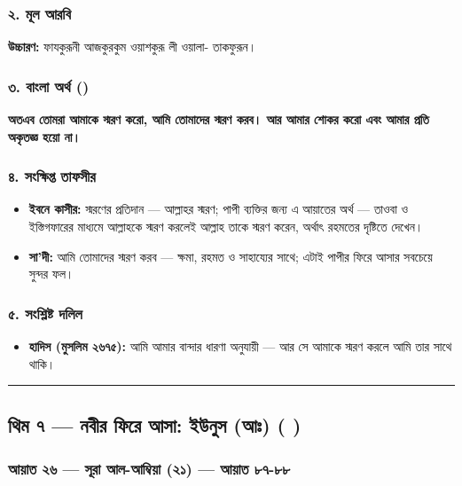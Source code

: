 \subsubsection*{২. মূল আরবি}

\begin{center}\end{center}
\textbf{উচ্চারণ:} ফাযকুরূনী আজকুরকুম ওয়াশকুরূ লী ওয়ালা- তাকফুরূন।

\subsubsection*{৩. বাংলা অর্থ ()}

\textbf{অতএব তোমরা আমাকে স্মরণ করো, আমি তোমাদের স্মরণ করব। আর আমার শোকর করো এবং আমার প্রতি অকৃতজ্ঞ হয়ো না।}

\subsubsection*{৪. সংক্ষিপ্ত তাফসীর}

\begin{itemize}
\item \textbf{ইবনে কাসীর:} স্মরণের প্রতিদান — আল্লাহর স্মরণ; পাপী ব্যক্তির জন্য এ আয়াতের অর্থ — তাওবা ও ইস্তিগফারের মাধ্যমে আল্লাহকে স্মরণ করলেই আল্লাহ তাকে স্মরণ করেন, অর্থাৎ রহমতের দৃষ্টিতে দেখেন।
\item \textbf{সা'দী:} আমি তোমাদের স্মরণ করব — ক্ষমা, রহমত ও সাহায্যের সাথে; এটাই পাপীর ফিরে আসার সবচেয়ে সুন্দর ফল।
\end{itemize}
\subsubsection*{৫. সংশ্লিষ্ট দলিল}

\begin{itemize}
\item \textbf{হাদিস (মুসলিম ২৬৭৫):} আমি আমার বান্দার ধারণা অনুযায়ী — আর সে আমাকে স্মরণ করলে আমি তার সাথে থাকি।
\end{itemize}
\medskip\hrule\medskip

\subsection*{থিম ৭ — নবীর ফিরে আসা: ইউনুস (আঃ) (  )}

\subsubsection*{আয়াত ২৬ — সূরা আল-আম্বিয়া (২১) — আয়াত ৮৭-৮৮}

